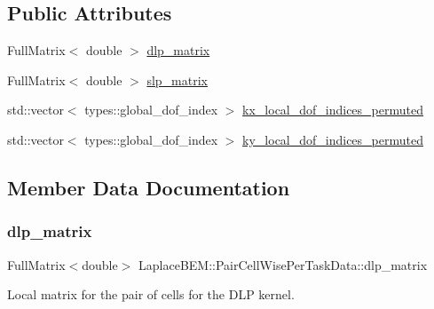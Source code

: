\subsection*{Public Attributes}
\begin{DoxyCompactItemize}
\item 
Full\+Matrix$<$ double $>$ \hyperlink{structLaplaceBEM_1_1PairCellWisePerTaskData_a35b4a45b92bf0c8c36107fdc80c966cb}{dlp\+\_\+matrix}
\item 
Full\+Matrix$<$ double $>$ \hyperlink{structLaplaceBEM_1_1PairCellWisePerTaskData_aa96b7a6991e47201c7f1f6a9fdfa8680}{slp\+\_\+matrix}
\item 
std\+::vector$<$ types\+::global\+\_\+dof\+\_\+index $>$ \hyperlink{structLaplaceBEM_1_1PairCellWisePerTaskData_ad258060f7c6dfce99a40508320bb54bc}{kx\+\_\+local\+\_\+dof\+\_\+indices\+\_\+permuted}
\item 
std\+::vector$<$ types\+::global\+\_\+dof\+\_\+index $>$ \hyperlink{structLaplaceBEM_1_1PairCellWisePerTaskData_a4ebad8073a36303fd26b67acd9a0d9b8}{ky\+\_\+local\+\_\+dof\+\_\+indices\+\_\+permuted}
\end{DoxyCompactItemize}


\subsection{Member Data Documentation}
\mbox{\label{structLaplaceBEM_1_1PairCellWisePerTaskData_a35b4a45b92bf0c8c36107fdc80c966cb}} 
\subsubsection{\texorpdfstring{dlp\+\_\+matrix}{dlp\_matrix}}
{\footnotesize\ttfamily Full\+Matrix$<$double$>$ Laplace\+B\+E\+M\+::\+Pair\+Cell\+Wise\+Per\+Task\+Data\+::dlp\+\_\+matrix}

Local matrix for the pair of cells for the D\+LP kernel. \mbox{\label{structLaplaceBEM_1_1PairCellWisePerTaskData_ad258060f7c6dfce99a40508320bb54bc}} 
